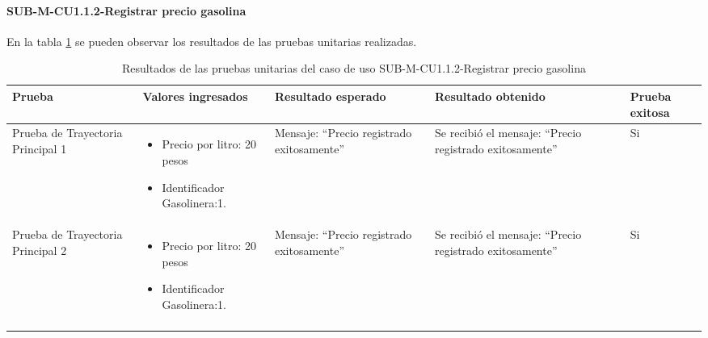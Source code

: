 \paragraph{SUB-M-CU1.1.2-Registrar precio gasolina}\label{SUB-M-CU1.1.2:Pruebas}
En la tabla \ref{pruebas_unitarias_sub-m-cu1.1.2} se pueden observar los resultados de las pruebas unitarias realizadas.
\begin{longtable}{|M{2cm}| M{4.5cm}|M{3cm}|M{3cm}|M{1.5cm}|}
	\hline
	\textbf{Prueba} & \textbf{Valores ingresados} & \textbf{Resultado esperado} & \textbf{Resultado obtenido} & \textbf{Prueba exitosa} \\ \hline
	Prueba de Trayectoria Principal 1& 
	\begin{itemize}
		\item Precio por litro: 20 pesos
		\item Identificador Gasolinera:1.
	\end{itemize}
	& Mensaje: ``Precio registrado exitosamente'' & Se recibió el mensaje: ``Precio registrado exitosamente'' & Si \\ \hline
	Prueba de Trayectoria Principal 2& 
	\begin{itemize}
		\item Precio por litro: 20 pesos
		\item Identificador Gasolinera:1.
	\end{itemize}
	& Mensaje: ``Precio registrado exitosamente'' & Se recibió el mensaje: ``Precio registrado exitosamente'' & Si \\ \hline
	\caption{Resultados de las pruebas unitarias del caso de uso SUB-M-CU1.1.2-Registrar precio gasolina}
	\label{pruebas_unitarias_sub-m-cu1.1.2}
\end{longtable}
